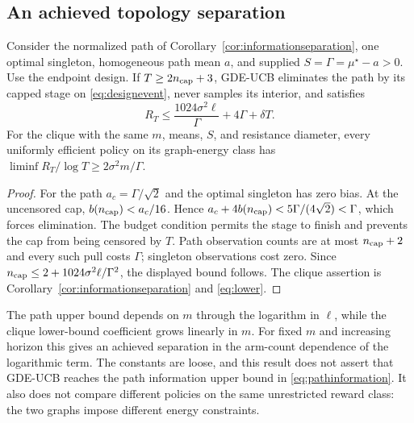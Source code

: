 \subsection{An achieved topology separation}
\begin{corollary}
Consider the normalized path of Corollary~\ref{cor:informationseparation}, one optimal singleton, homogeneous path mean $a$, and supplied $S=\Gamma=\mu^\star-a>0$. Use the endpoint design. If $T\ge2n_{\rm cap}+3$, GDE-UCB eliminates the path by its capped stage on \eqref{eq:designevent}, never samples its interior, and satisfies
\begin{equation}
 R_T\le\frac{1024\sigma^2\ell}{\Gamma}+4\Gamma+\delta T.
 \label{eq:achievedpath}
\end{equation}
For the clique with the same $m$, means, $S$, and resistance diameter, every uniformly efficient policy on its graph-energy class has
$\liminf R_T/\log T\ge2\sigma^2m/\Gamma$.
\label{cor:achievedseparation}
\end{corollary}
\begin{proof}
For the path $a_c=\Gamma/\sqrt2$ and the optimal singleton has zero bias. At the uncensored cap, $b(n_{\rm cap})<a_c/16$. Hence
$a_c+4b(n_{\rm cap})<5\Gamma/(4\sqrt2)<\Gamma$, which forces elimination. The budget condition permits the stage to finish and prevents the cap from being censored by $T$. Path observation counts are at most $n_{\rm cap}+2$ and every such pull costs $\Gamma$; singleton observations cost zero. Since $n_{\rm cap}\le2+1024\sigma^2\ell/\Gamma^2$, the displayed bound follows. The clique assertion is Corollary~\ref{cor:informationseparation} and \eqref{eq:lower}.
\end{proof}
The path upper bound depends on $m$ through the logarithm in $\ell$, while the clique lower-bound coefficient grows linearly in $m$. For fixed $m$ and increasing horizon this gives an achieved separation in the arm-count dependence of the logarithmic term. The constants are loose, and this result does not assert that GDE-UCB reaches the path information upper bound in \eqref{eq:pathinformation}. It also does not compare different policies on the same unrestricted reward class: the two graphs impose different energy constraints.

